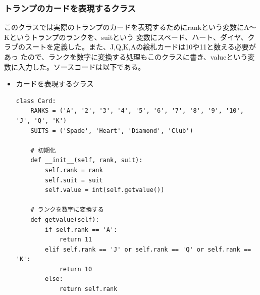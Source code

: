 \subsubsection{トランプのカードを表現するクラス}
このクラスでは実際のトランプのカードを表現するためにrankという変数にA～Kというトランプのランクを、suitという
変数にスペード、ハート、ダイヤ、クラブのスートを定義した。また、J,Q,K,Aの絵札カードは10や11と数える必要があっ
たので、ランクを数字に変換する処理もこのクラスに書き、valueという変数に入力した。ソースコードは以下である。
\begin{itemize}
\item カードを表現するクラス
\begin{lstlisting}
class Card:
    RANKS = ('A', '2', '3', '4', '5', '6', '7', '8', '9', '10', 'J', 'Q', 'K')
    SUITS = ('Spade', 'Heart', 'Diamond', 'Club')

    # 初期化
    def __init__(self, rank, suit):
        self.rank = rank
        self.suit = suit
        self.value = int(self.getvalue())

    # ランクを数字に変換する
    def getvalue(self):
        if self.rank == 'A':
            return 11
        elif self.rank == 'J' or self.rank == 'Q' or self.rank == 'K':
            return 10
        else:
            return self.rank
\end{lstlisting}
\end{itemize}

